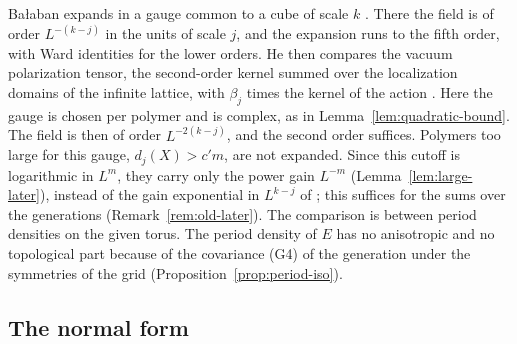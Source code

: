 Ba\l aban expands in a gauge common to a cube of scale $k$ \cite[after (0.27)]{BalYM4I}. There the field is of order $L^{-(k-j)}$ in the units of scale $j$, and the expansion runs to the fifth order, with Ward identities for the lower orders. He then compares the vacuum polarization tensor, the second-order kernel summed over the localization domains of the infinite lattice, with $\beta_j$ times the kernel of the action \cite[(4.36)--(4.45)]{BalYM4I}. Here the gauge is chosen per polymer and is complex, as in Lemma~\ref{lem:quadratic-bound}. The field is then of order $L^{-2(k-j)}$, and the second order suffices. Polymers too large for this gauge, $d_j(X)>c'm$, are not expanded. Since this cutoff is logarithmic in $L^m$, they carry only the power gain $L^{-m}$ (Lemma~\ref{lem:large-later}), instead of the gain exponential in $L^{k-j}$ of \cite[(0.27)]{BalYM4I}; this suffices for the sums over the generations (Remark~\ref{rem:old-later}). The comparison is between period densities on the given torus. The period density of $E$ has no anisotropic and no topological part because of the covariance (G4) of the generation under the symmetries of the grid (Proposition~\ref{prop:period-iso}).

\subsection{The normal form}\label{subsec:extraction-nf}

